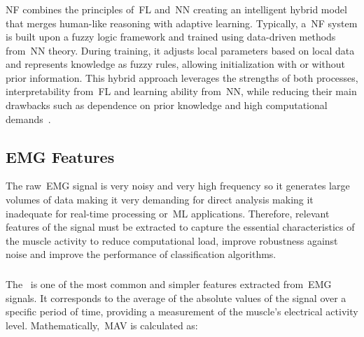 \subsubsection{} 
\label{sssec:neuro_fuzzy_hybridization}

\gls{NF} combines the principles of~\gls{FL} and~\gls{NN} creating an intelligent hybrid model that merges human-like reasoning with adaptive learning. Typically, a~\gls{NF} system is built upon a fuzzy 
logic framework and trained using data-driven methods from~\gls{NN} theory. During training, it adjusts local parameters based on local data and represents knowledge as fuzzy rules, 
allowing initialization with or without prior information. This hybrid approach leverages the strengths of both processes, interpretability from~\gls{FL} and learning ability from~\gls{NN}, 
while reducing their main drawbacks such as dependence on prior knowledge and high computational demands~\cite{ComprehensiveStudyOnEMG}.





\subsection{EMG Features}
\label{ssec:emg_features}
The raw~\gls{EMG} signal is very noisy and very high frequency so it generates large volumes of data making it very demanding for direct analysis making it inadequate for real-time 
processing or~\gls{ML} applications. Therefore, relevant features of the signal must be extracted to capture the essential characteristics of the muscle activity to reduce 
computational load, improve robustness against noise and improve the performance of classification algorithms. 

\subsubsection{} 
\label{sssec:mean_absolute_value}

The~ is one of the most common and simpler features extracted from~\gls{EMG} signals. It corresponds to the average of the absolute values of the signal over a 
specific period of time, providing a measurement of the muscle's electrical activity level. 
Mathematically,~\gls{MAV} is calculated as:

